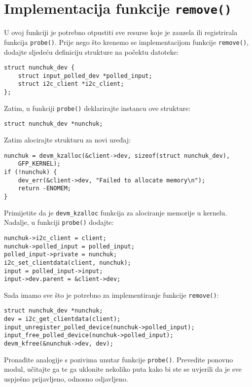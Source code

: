 \documentclass[11pt]{article}
\begin{document}
\section{Implementacija funkcije \texttt{remove()}}
U ovoj funkciji je potrebno otpustiti sve resurse koje je zauzela ili
registrirala funkcija \texttt{probe()}.
\newline
\newline
Prije nego što krenemo se implementacijom funkcije \texttt{remove()},
dodajte sljedeću definiciju strukture na počektu datoteke:
\begin{lstlisting}
struct nunchuk_dev {
	struct input_polled_dev *polled_input;
	struct i2c_client *i2c_client;
};
\end{lstlisting}
Zatim, u funkciji \texttt{probe()} deklarirajte instancu ove strukture:
\begin{lstlisting}
struct nunchuk_dev *nunchuk;
\end{lstlisting}
Zatim alocirajte strukturu za novi uređaj:
\begin{lstlisting}
nunchuk = devm_kzalloc(&client->dev, sizeof(struct nunchuk_dev),
	GFP_KERNEL);
if (!nunchuk) {
	dev_err(&client->dev, "Failed to allocate memory\n");
	return -ENOMEM;
}
\end{lstlisting}
Primijetite da je \texttt{devm\_kzalloc} funkcija za alociranje memorije u
kernelu.
Nadalje, u funkciji \texttt{probe()} dodajte:
\begin{lstlisting}
nunchuk->i2c_client = client;
nunchuk->polled_input = polled_input;
polled_input->private = nunchuk;
i2c_set_clientdata(client, nunchuk);
input = polled_input->input;
input->dev.parent = &client->dev;
\end{lstlisting}
Sada imamo sve što je potrebno za implementiranje funkcije \texttt{remove()}:
\begin{lstlisting}
struct nunchuk_dev *nunchuk;
dev = i2c_get_clientdata(client);
input_unregister_polled_device(nunchuk->polled_input);
input_free_polled_device(nunchuk->polled_input);
devm_kfree(&nunchuk->dev, dev);
\end{lstlisting}
Pronađite analogije s pozivima unutar funkcije \texttt{probe()}.
\newline
\newline
Prevedite ponovno modul, učitajte ga te ga uklonite nekoliko puta kako bi ste
se uvjerili da je sve uspješno prijavljeno, odnosno odjavljeno.
\end{document}
